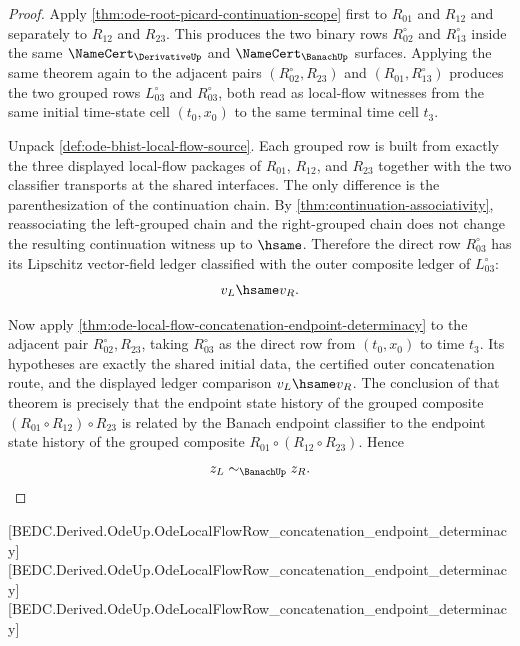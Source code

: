 \begin{proof}
Apply \autoref{thm:ode-root-picard-continuation-scope} first to $R_{01}$ and $R_{12}$ and separately to $R_{12}$ and $R_{23}$. This produces the two binary rows $R_{02}^{\circ}$ and $R_{13}^{\circ}$ inside the same $\NameCert_{\DerivativeUp}$ and $\NameCert_{\BanachUp}$ surfaces. Applying the same theorem again to the adjacent pairs $(R_{02}^{\circ},R_{23})$ and $(R_{01},R_{13}^{\circ})$ produces the two grouped rows $L_{03}^{\circ}$ and $R_{03}^{\circ}$, both read as local-flow witnesses from the same initial time-state cell $(t_0,x_0)$ to the same terminal time cell $t_3$.

Unpack \autoref{def:ode-bhist-local-flow-source}. Each grouped row is built from exactly the three displayed local-flow packages of $R_{01}$, $R_{12}$, and $R_{23}$ together with the two classifier transports at the shared interfaces. The only difference is the parenthesization of the continuation chain. By \autoref{thm:continuation-associativity}, reassociating the left-grouped chain and the right-grouped chain does not change the resulting continuation witness up to $\hsame$. Therefore the direct row $R_{03}^{\circ}$ has its Lipschitz vector-field ledger classified with the outer composite ledger of $L_{03}^{\circ}$:
$$
v_L\hsame v_R.
$$

Now apply \autoref{thm:ode-local-flow-concatenation-endpoint-determinacy} to the adjacent pair $R_{02}^{\circ},R_{23}$, taking $R_{03}^{\circ}$ as the direct row from $(t_0,x_0)$ to time $t_3$. Its hypotheses are exactly the shared initial data, the certified outer concatenation route, and the displayed ledger comparison $v_L\hsame v_R$. The conclusion of that theorem is precisely that the endpoint state history of the grouped composite $(R_{01}\circ R_{12})\circ R_{23}$ is related by the Banach endpoint classifier to the endpoint state history of the grouped composite $R_{01}\circ(R_{12}\circ R_{23})$. Hence
$$
z_L\sim_{\BanachUp} z_R.
$$
\end{proof}

[BEDC.Derived.OdeUp.OdeLocalFlowRow\_concatenation\_endpoint\_determinacy]
[BEDC.Derived.OdeUp.OdeLocalFlowRow\_concatenation\_endpoint\_determinacy]
[BEDC.Derived.OdeUp.OdeLocalFlowRow\_concatenation\_endpoint\_determinacy]

